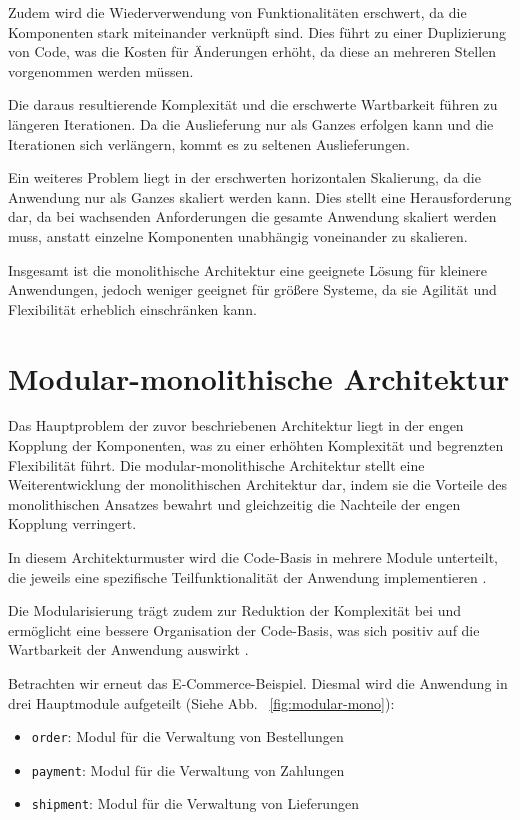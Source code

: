 \documentclass[acmtog]{acmart}
\begin{document}
Zudem wird die Wiederverwendung von Funktionalitäten erschwert, da die Komponenten
stark miteinander verknüpft sind.
Dies führt zu einer Duplizierung von Code, was die Kosten für Änderungen erhöht,
da diese an mehreren Stellen vorgenommen werden müssen.

Die daraus resultierende Komplexität und die erschwerte Wartbarkeit führen zu längeren
Iterationen.
Da die Auslieferung nur als Ganzes erfolgen kann und die Iterationen
sich verlängern, kommt es zu seltenen Auslieferungen.

Ein weiteres Problem liegt in der erschwerten horizontalen Skalierung, da die Anwendung
nur als Ganzes skaliert werden kann.
Dies stellt eine Herausforderung dar, da bei wachsenden
Anforderungen die gesamte Anwendung skaliert werden muss, anstatt einzelne Komponenten unabhängig
voneinander zu skalieren.

Insgesamt ist die monolithische Architektur eine geeignete Lösung für
kleinere Anwendungen, jedoch weniger geeignet für größere Systeme, da sie Agilität und
Flexibilität erheblich einschränken kann.

\section{Modular-monolithische Architektur}
\label{sec:modulith}
Das Hauptproblem der zuvor beschriebenen Architektur liegt in der engen Kopplung der Komponenten,
was zu einer erhöhten Komplexität und begrenzten Flexibilität führt.
Die modular-monolithische Architektur stellt eine Weiterentwicklung der monolithischen Architektur dar,
indem sie die Vorteile des monolithischen Ansatzes bewahrt und gleichzeitig die Nachteile
der engen Kopplung verringert.

In diesem Architekturmuster wird die Code-Basis in mehrere Module unterteilt, die jeweils
eine spezifische Teilfunktionalität der Anwendung implementieren \cite[11]{modular-mono2}.

Die Modularisierung trägt zudem zur Reduktion der Komplexität bei und ermöglicht eine bessere
Organisation der Code-Basis, was sich positiv auf die Wartbarkeit der Anwendung auswirkt \cite[23 - 24]{modular-mono4}.


Betrachten wir erneut das E-Commerce-Beispiel.
Diesmal wird die Anwendung in drei Hauptmodule aufgeteilt (Siehe Abb. ~\ref{fig:modular-mono}):
\begin{itemize}
  \item \texttt{order}: Modul für die Verwaltung von Bestellungen
  \item \texttt{payment}: Modul für die Verwaltung von Zahlungen
  \item \texttt{shipment}: Modul für die Verwaltung von Lieferungen
\end{itemize}
\end{document}
